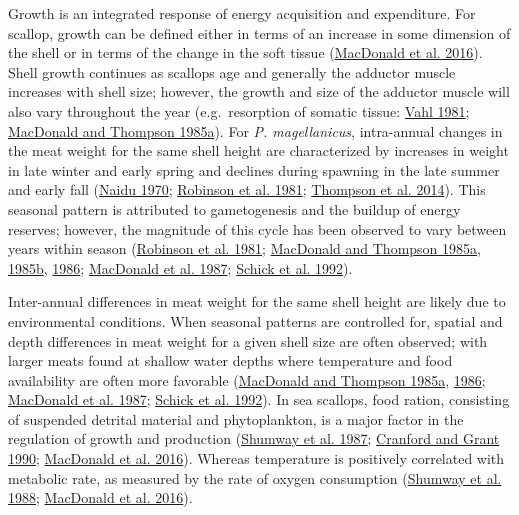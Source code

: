 \documentclass[
]{article}
\begin{document}
Growth is an integrated response of energy acquisition and expenditure. For scallop, growth can be defined either in terms of an increase in some dimension of the shell or in terms of the change in the soft tissue (\protect\hyperlink{ref-macdonaldPhysiologyEnergyAcquisition2016}{MacDonald et al. 2016}). Shell growth continues as scallops age and generally the adductor muscle increases with shell size; however, the growth and size of the adductor muscle will also vary throughout the year (e.g.~resorption of somatic tissue: \protect\hyperlink{ref-vahlEnergyTransformationsIceland1981}{Vahl 1981}; \protect\hyperlink{ref-macdonaldInfluenceTemperatureFood1985}{MacDonald and Thompson 1985a}). For \emph{P. magellanicus}, intra-annual changes in the meat weight for the same shell height are characterized by increases in weight in late winter and early spring and declines during spawning in the late summer and early fall (\protect\hyperlink{ref-naiduReproductionBreedingCycle1970}{Naidu 1970}; \protect\hyperlink{ref-robinsonSeasonalChangesSoftbody1981}{Robinson et al. 1981}; \protect\hyperlink{ref-thompsonIdentifyingSpawningEvents2014}{Thompson et al. 2014}). This seasonal pattern is attributed to gametogenesis and the buildup of energy reserves; however, the magnitude of this cycle has been observed to vary between years within season (\protect\hyperlink{ref-robinsonSeasonalChangesSoftbody1981}{Robinson et al. 1981}; \protect\hyperlink{ref-macdonaldInfluenceTemperatureFood1985}{MacDonald and Thompson 1985a}, \protect\hyperlink{ref-macdonaldInfluenceTemperatureFood1985a}{1985b}, \protect\hyperlink{ref-macdonaldInfluenceTemperatureFood1986}{1986}; \protect\hyperlink{ref-macdonaldInfluenceTemperatureFood1987}{MacDonald et al. 1987}; \protect\hyperlink{ref-schickAllometricRelationshipsGrowth1992a}{Schick et al. 1992}).

Inter-annual differences in meat weight for the same shell height are likely due to environmental conditions. When seasonal patterns are controlled for, spatial and depth differences in meat weight for a given shell size are often observed; with larger meats found at shallow water depths where temperature and food availability are often more favorable (\protect\hyperlink{ref-macdonaldInfluenceTemperatureFood1985}{MacDonald and Thompson 1985a}, \protect\hyperlink{ref-macdonaldInfluenceTemperatureFood1986}{1986}; \protect\hyperlink{ref-macdonaldInfluenceTemperatureFood1987}{MacDonald et al. 1987}; \protect\hyperlink{ref-schickAllometricRelationshipsGrowth1992a}{Schick et al. 1992}). In sea scallops, food ration, consisting of suspended detrital material and phytoplankton, is a major factor in the regulation of growth and production (\protect\hyperlink{ref-shumwayFoodResourcesRelated1987}{Shumway et al. 1987}; \protect\hyperlink{ref-cranfordParticleClearanceAbsorption1990}{Cranford and Grant 1990}; \protect\hyperlink{ref-macdonaldPhysiologyEnergyAcquisition2016}{MacDonald et al. 2016}). Whereas temperature is positively correlated with metabolic rate, as measured by the rate of oxygen consumption (\protect\hyperlink{ref-shumwaySeasonalChangesOxygen1988}{Shumway et al. 1988}; \protect\hyperlink{ref-macdonaldPhysiologyEnergyAcquisition2016}{MacDonald et al. 2016}).
\end{document}
